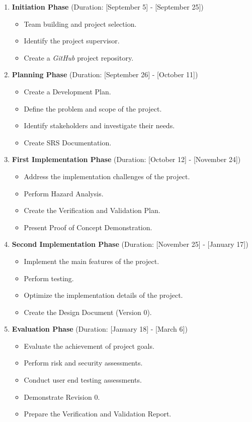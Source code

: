 \documentclass{article}
\begin{document}
\begin{enumerate}
  \item \textbf{Initiation Phase} (Duration: [September 5] - [September 25])
  \begin{itemize}
    \item Team building and project selection.
    \item Identify the project supervisor.
    \item Create a \textit{GitHub} project repository.
  \end{itemize}

  \item \textbf{Planning Phase} (Duration: [September 26] - [October 11])
  \begin{itemize}
    \item Create a Development Plan.
    \item Define the problem and scope of the project.
    \item Identify stakeholders and investigate their needs.
    \item Create SRS Documentation.
  \end{itemize}

  \item \textbf{First Implementation Phase} (Duration: [October 12] - [November 24])
  \begin{itemize}
    \item Address the implementation challenges of the project.
    \item Perform Hazard Analysis.
    \item Create the Verification and Validation Plan.
    \item Present Proof of Concept Demonstration.
  \end{itemize}
  
  \item \textbf{Second Implementation Phase} (Duration: [November 25] - [January 17])
  \begin{itemize}
    \item Implement the main features of the project.
    \item Perform testing.
    \item Optimize the implementation details of the project.
    \item Create the Design Document (Version 0).
  \end{itemize}

  \item \textbf{Evaluation Phase} (Duration: [January 18] - [March 6])
  \begin{itemize}
    \item Evaluate the achievement of project goals.
    \item Perform risk and security assessments.
    \item Conduct user end testing assessments.
    \item Demonstrate Revision 0.
    \item Prepare the Verification and Validation Report.
  \end{itemize}


\end{enumerate}
\end{document}
